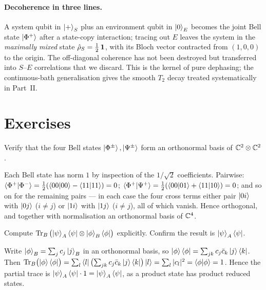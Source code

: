 \begin{chaptersummary}
\paragraph{Decoherence in three lines.}
A system qubit in $\ket{+}_S$ plus an environment qubit in
$\ket{0}_E$ becomes the joint Bell state $\ket{\Phi^+}$ after a
state-copy interaction; tracing out $E$ leaves the system in the
\emph{maximally mixed} state $\hat{\rho}_S=\tfrac12\,\mathbf{1}$, with its
Bloch vector contracted from $(1,0,0)$ to the origin. The
off-diagonal coherence has not been destroyed but transferred into
$S$--$E$ correlations that we discard. This is the kernel of pure
dephasing; the continuous-bath generalisation gives the smooth
$T_2$ decay treated systematically in Part~II.

\end{chaptersummary}

\section*{Exercises}

\begin{exercise}
Verify that the four Bell states
$\ket{\Phi^\pm},\ket{\Psi^\pm}$ form an orthonormal basis of
$\mathbb{C}^2\otimes\mathbb{C}^2$.
\begin{solution}
Each Bell state has norm $1$ by inspection of the
$1/\sqrt 2$ coefficients. Pairwise:
$\braket{\Phi^+}{\Phi^-}=\tfrac12(\braket{00}{00}-\braket{11}{11})=0$;
$\braket{\Phi^+}{\Psi^+}=\tfrac12(\braket{00}{01}+\braket{11}{10})=0$;
and so on for the remaining pairs --- in each case the four cross
terms either pair $\ket{0i}$ with $\ket{0j}$ ($i\neq j$) or
$\ket{1i}$ with $\ket{1j}$ ($i\neq j$), all of which vanish.
Hence orthogonal, and together with normalisation an orthonormal
basis of $\mathbb{C}^4$.
\end{solution}
\end{exercise}

\begin{exercise}
Compute $\operatorname{Tr}_B\,\bigl(\ket{\psi}_A\bra{\psi}\otimes\ket{\phi}_B\bra{\phi}\bigr)$
explicitly. Confirm the result is $\ket{\psi}_A\bra{\psi}$.
\begin{solution}
Write $\ket{\phi}_B=\sum_j c_j\ket{j}_B$ in an orthonormal basis,
so $\ket{\phi}\bra{\phi}=\sum_{jk}c_j\bar c_k\ket{j}\bra{k}$. Then
$\operatorname{Tr}_B\bigl(\ket{\phi}\bra{\phi}\bigr)=\sum_l\bra{l}\bigl(\sum_{jk}c_j\bar c_k\ket{j}\bra{k}\bigr)\ket{l}
=\sum_l|c_l|^2=\braket{\phi}{\phi}=1$.
Hence the partial trace is
$\ket{\psi}_A\bra{\psi}\cdot 1=\ket{\psi}_A\bra{\psi}$, as a product
state has product reduced states.
\end{solution}
\end{exercise}


